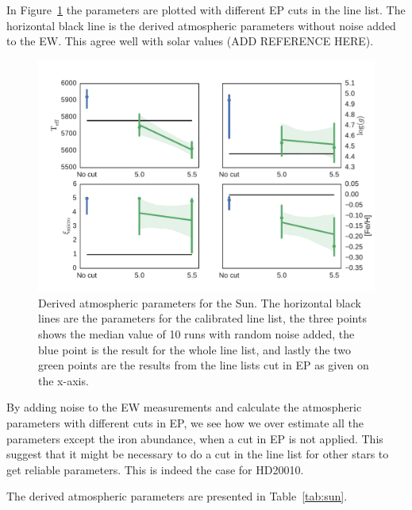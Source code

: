 \documentclass{aa}
\begin{document}
In Figure~\ref{fig:solar_parameters} the parameters are plotted with
different EP cuts in the line list. The horizontal black line is the
derived atmospheric parameters without noise added to the EW. This agree
well with solar values (ADD REFERENCE HERE).

\begin{figure}[htpb]
    \centering
    \includegraphics[width=0.9\linewidth]{figures/solar_parameters_10runs.pdf}
    \caption{Derived atmospheric parameters for the Sun. The horizontal
    black lines are the parameters for the calibrated line list, the
    three points shows the median value of 10 runs with random noise
    added, the blue point is the result for the whole line list, and
    lastly the two green points are the results from the line lists cut
    in EP as given on the x-axis.}
    \label{fig:solar_parameters}
\end{figure}

By adding noise to the EW measurements and calculate the atmospheric
parameters with different cuts in EP, we see how we over estimate all
the parameters except the iron abundance, when a cut in EP is not
applied. This suggest that it might be necessary to do a cut in the line
list for other stars to get reliable parameters. This is indeed the case
for HD20010.

The derived atmospheric parameters are presented in Table~\ref{tab:sun}.
\end{document}
